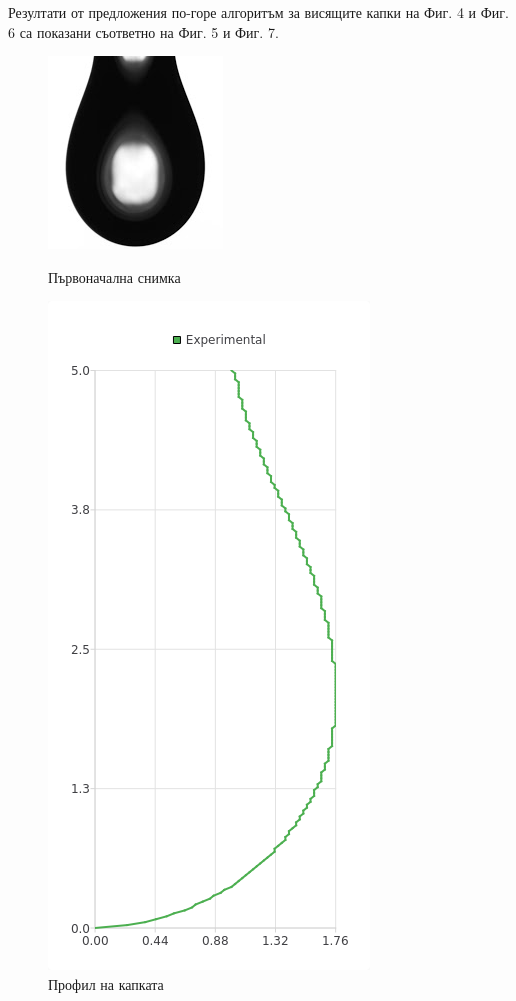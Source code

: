 \documentclass{article}
\begin{document}
Резултати от предложения по-горе алгоритъм за висящите капки на Фиг. 4 и Фиг. 6 са показани съответно на Фиг. 5 и Фиг. 7.

\begin{figure}[H]
\centering
\begin{minipage}{0.5\textwidth}
  \centering
  \includegraphics[width=0.5\linewidth]{pendant_drop_1.png}
  \caption{Първоначална снимка}
\end{minipage}%
\begin{minipage}{0.5\textwidth}
  \centering
  \includegraphics[width=0.4\linewidth]{pendant_drop_1_profile.png}
  \caption{Профил на капката}
\end{minipage}
\end{figure}
\end{document}
